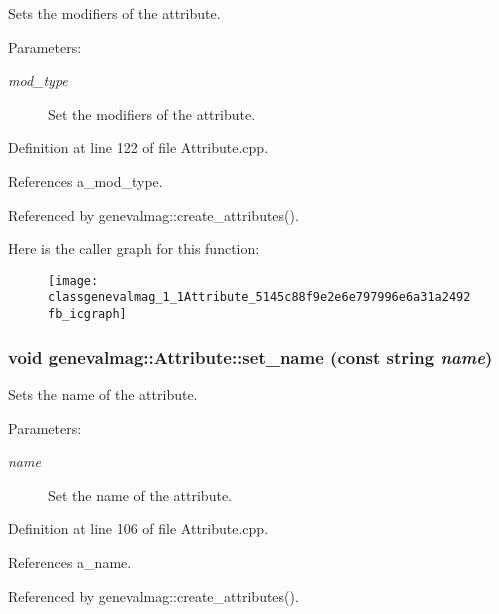 Sets the modifiers of the attribute. \begin{Desc}
\item[Parameters:]
\begin{description}
\item[{\em mod\_\-type}]Set the modifiers of the attribute. \end{description}
\end{Desc}


Definition at line 122 of file Attribute.cpp.

References a\_\-mod\_\-type.

Referenced by genevalmag::create\_\-attributes().

Here is the caller graph for this function:\nopagebreak
\begin{figure}[H]
\begin{center}
\leavevmode
\texttt{[image: classgenevalmag\_1\_1Attribute\_5145c88f9e2e6e797996e6a31a2492fb\_icgraph]}
\end{center}
\end{figure}
\hypertarget{classgenevalmag_1_1Attribute_295fa8b9fd96ca034adb8acd0c89b7ce}{
\subsubsection[{set\_\-name}]{\setlength{\rightskip}{0pt plus 5cm}void genevalmag::Attribute::set\_\-name (const string {\em name})}}
\label{classgenevalmag_1_1Attribute_295fa8b9fd96ca034adb8acd0c89b7ce}


Sets the name of the attribute. \begin{Desc}
\item[Parameters:]
\begin{description}
\item[{\em name}]Set the name of the attribute. \end{description}
\end{Desc}


Definition at line 106 of file Attribute.cpp.

References a\_\-name.

Referenced by genevalmag::create\_\-attributes().

